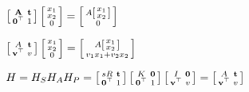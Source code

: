 \documentclass[12pt,a4paper]{article}
\begin{document}
$\left[ {\begin{smallmatrix}
 {\bf A} & {\bf t}\\
 {\bf 0}^{\top} & 1 \\
\end{smallmatrix} } \right] \left[ {\begin{smallmatrix}
 x_{1}\\
 x_{2}\\
 0\\
\end{smallmatrix} } \right] = \left[ {\begin{smallmatrix}
 A\left[ {\begin{smallmatrix}
  x_{1}\\
   x_{2}\\
 \end{smallmatrix} } \right]\\
 0\\
\end{smallmatrix} } \right]
$

$\left[ {\begin{smallmatrix}
  A & {\bf t}\\
 {\bf v}^{\top} & v \\
\end{smallmatrix} } \right] \left[ {\begin{smallmatrix}
 x_{1}\\
 x_{2}\\
 0\\
\end{smallmatrix} } \right] = \left[ {\begin{smallmatrix}
 A\left[ {\begin{smallmatrix}
  x_{1}\\
   x_{2}\\
 \end{smallmatrix} } \right]\\
 v_{1}x_{1}+v_{2}x_{2}\\
\end{smallmatrix} } \right]
$

$H = H_{S}H_{A}H_{P} = \left[ {\begin{smallmatrix}
 sR & {\bf t}\\
 {\bf 0}^{\top} & 1 \\
\end{smallmatrix} } \right]\left[ {\begin{smallmatrix}
 K & {\bf 0}\\
 {\bf 0}^{\top} & 1 \\
\end{smallmatrix} } \right]\left[ {\begin{smallmatrix}
 I & {\bf 0}\\
 {\bf v}^{\top} & v \\
\end{smallmatrix} } \right]=\left[ {\begin{smallmatrix}
 A & {\bf t}\\
 {\bf v}^{\top} & v \\
\end{smallmatrix} } \right]
$
\end{document}
